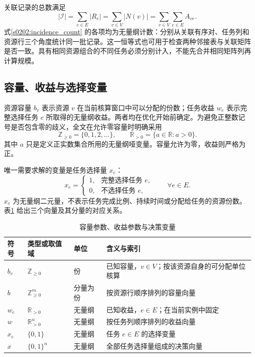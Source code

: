 关联记录的总数满足
\begin{equation}
 |\mathcal I|
 =\sum_{e\in E}|R_e|
 =\sum_{v\in V}|N(v)|
 =\sum_{v\in V}\sum_{e\in E}A_{ve}.
 \label{s0202:incidence_count}
\end{equation}
式\eqref{s0202:incidence_count} 的各项均为无量纲计数：分别从关联有序对、任务列和资源行三个角度统计同一批记录。这一恒等式也可用于检查两种邻接表与关联矩阵是否一致。具有相同资源组合的不同任务必须分别计入，不能先合并相同矩阵列再计算规模。

\subsection{容量、收益与选择变量}

资源容量 $b_v$ 表示资源 $v$ 在当前核算窗口中可以分配的份数；任务收益 $w_e$ 表示完整选择任务 $e$ 所取得的无量纲收益。两者均在优化开始前确定。为避免正整数记号是否包含零的歧义，全文在允许零容量时明确采用
\begin{equation}
 \mathbb Z_{\geq0}=\{0,1,2,\ldots\},
 \qquad
 \mathbb R_{>0}=\{a\in\mathbb R:a>0\}.
 \label{s0202:number_domains}
\end{equation}
其中 $a$ 只是定义正实数集合所用的无量纲哑变量。容量允许为零，收益则严格为正。

唯一需要求解的变量是任务选择量 $x_e$：
\begin{equation}
 x_e=
 \begin{cases}
  1,&\text{完整选择任务 }e,\\
  0,&\text{不选择任务 }e,
 \end{cases}
 \qquad \forall e\in E.
 \label{s0202:selection_meaning}
\end{equation}
$x_e$ 为无量纲二元量，不表示任务完成比例、持续时间或分配给任务的资源份数。表\ref{s0202:data_decision_symbols} 给出三个向量及其分量的对应关系。

\begin{table}[htbp]
 \centering
 \caption{容量参数、收益参数与决策变量}
 \label{s0202:data_decision_symbols}
 \small
 \begin{tabularx}{\linewidth}{@{}l l l X@{}}
  \toprule
  符号 & 类型或取值域 & 单位 & 含义与索引 \\
  \midrule
  $b_v$ & $\mathbb Z_{\geq0}$ & 份 & 已知容量，$v\in V$；按该资源自身的可分配单位核算 \\
  $b$ & $\mathbb Z_{\geq0}^{m}$ & 分量为份 & 按资源行顺序排列的容量向量 \\
  $w_e$ & $\mathbb R_{>0}$ & 无量纲 & 已知收益，$e\in E$；在当前实例中固定 \\
  $w$ & $\mathbb R_{>0}^{n}$ & 无量纲 & 按任务列顺序排列的收益向量 \\
  $x_e$ & $\{0,1\}$ & 无量纲 & 任务 $e\in E$ 的选择变量 \\
  $x$ & $\{0,1\}^{n}$ & 无量纲 & 全部任务选择量组成的决策向量 \\
  \bottomrule
 \end{tabularx}
\end{table}

